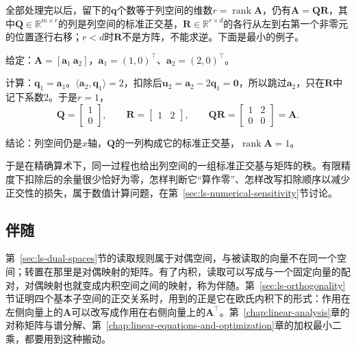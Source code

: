 全部处理完以后，留下的$\bm q$个数等于列空间的维数$r=\operatorname{rank}\bm A$，仍有$\bm A=\bm Q\bm R$，其中$\bm Q\in\mathbb R^{m\times r}$的列是列空间的标准正交基，$\bm R\in\mathbb R^{r\times d}$的各行从左到右第一个非零元的位置逐行右移；$r<d$时$\bm R$不是方阵，不能求逆。下面是最小的例子。
\begin{example}[列相关时跳过零余量]
\label{ex:ls-qr-dependent-columns}
给定：$\bm A=[\bm a_1\ \bm a_2]$，$\bm a_1=(1,0)^\top$、$\bm a_2=(2,0)^\top$。

计算：$\bm q_1=\bm a_1$。$\langle\bm a_2,\bm q_1\rangle=2$，扣除后$\bm u_2=\bm a_2-2\bm q_1=\bm0$，所以跳过$\bm a_2$，只在$\bm R$中记下系数$2$。于是$r=1$，
\[
 \bm Q=\begin{bmatrix}1\\0\end{bmatrix},\qquad
 \bm R=\begin{bmatrix}1&2\end{bmatrix},\qquad
 \bm Q\bm R=\begin{bmatrix}1&2\\0&0\end{bmatrix}=\bm A .
\]

结论：列空间仍是$x$轴，$\bm Q$的一列构成它的标准正交基，$\operatorname{rank}\bm A=1$。
\end{example}
于是在精确算术下，同一过程也给出列空间的一组标准正交基与矩阵的秩。有限精度下扣除后的余量很少恰好为零，怎样判断它“算作零”、怎样改写扣除顺序以减少正交性的损失，属于数值计算问题，在第~\ref{sec:ls-numerical-sensitivity}节讨论。

\subsection{伴随}
\label{sec:ls-adjoints}

第~\ref{sec:ls-dual-spaces}节的读取规则属于对偶空间，与被读取的向量不在同一个空间；转置在那里是对偶映射的矩阵。有了内积，读取可以写成与一个固定向量的配对，对偶映射也就变成内积空间之间的映射，称为伴随。第~\ref{sec:ls-orthogonality}节证明四个基本子空间的正交关系时，用到的正是它在欧氏内积下的形式：作用在左侧向量上的$\bm A$可以改写成作用在右侧向量上的$\bm A^\top$。第~\ref{chap:linear-analysis}章的对称矩阵与谱分解、第~\ref{chap:linear-equations-and-optimization}章的加权最小二乘，都要用到这种搬动。

